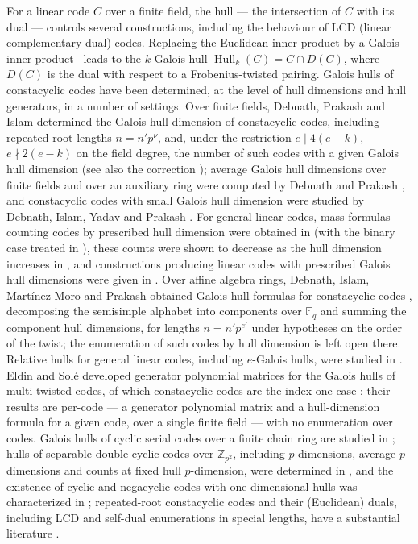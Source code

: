 \documentclass[10pt,journal,draftclsnofoot,onecolumn]{IEEEtran}
\theoremstyle{definition}
\theoremstyle{remark}
\newcommand{\Fq}{\mathbb{F}_q}
\newcommand{\Hull}{\operatorname{Hull}}
\begin{document}
For a linear code \(C\) over a finite field, the hull --- the intersection
of \(C\) with its dual --- controls several constructions, including
the behaviour of LCD (linear complementary dual) codes. Replacing the
Euclidean inner product by a Galois inner product~\cite{FZ2017} leads to the
\(k\)-Galois hull \(\Hull_k(C) = C \cap D(C)\), where \(D(C)\) is the dual
with respect to a Frobenius-twisted pairing. Galois hulls of constacyclic
codes have been determined, at the level of hull dimensions and hull
generators, in a number of settings. Over finite fields,
Debnath, Prakash and Islam determined the Galois hull dimension of
constacyclic codes, including repeated-root lengths \(n = n' p^{\nu}\),
and, under the restriction \(e \mid 4(e-k)\), \(e \nmid 2(e-k)\) on the
field degree, the number of such codes with a given Galois hull
dimension \cite{DPI2023} (see also the correction \cite{DPI2023corr}); average Galois hull dimensions over finite
fields and over an auxiliary ring were computed by Debnath and Prakash
\cite{DP2025}, and constacyclic codes with small Galois hull dimension
were studied by Debnath, Islam, Yadav and Prakash \cite{DIYP2026}. For general linear codes, mass formulas counting codes by prescribed hull dimension were obtained in \cite{LSL2025} (with the binary case treated in \cite{LS2024}), these counts were shown to decrease as the hull dimension increases in \cite{BBO2026}, and constructions producing linear codes with prescribed Galois hull dimensions were given in \cite{LYW2025}. Over
affine algebra rings, Debnath, Islam, Mart\'inez-Moro and Prakash obtained
Galois hull formulas for constacyclic codes \cite{DIMP2026},
decomposing the semisimple alphabet into components over \(\Fq\) and
summing the component hull dimensions, for lengths \(n = n' p^{e'}\)
under hypotheses on the order of the twist; the enumeration of such
codes by hull dimension is left open there. Relative hulls for general linear codes, including \(e\)-Galois hulls, were studied in \cite{ACLMRS2024}. Eldin and Sol\'e
developed generator polynomial matrices for the Galois hulls of
multi-twisted codes, of which constacyclic codes are the index-one case
\cite{ES2026}; their results are per-code --- a generator polynomial
matrix and a hull-dimension formula for a given code, over a single
finite field --- with no enumeration over codes. Galois hulls of cyclic serial codes over a finite chain ring are studied in
\cite{Talbi2021}; hulls of separable double cyclic codes over \(\mathbb{Z}_{p^2}\), including \(p\)-dimensions, average \(p\)-dimensions and counts at fixed hull \(p\)-dimension, were determined in \cite{DPDC2025}, and the existence of cyclic and negacyclic codes with one-dimensional hulls was characterized in \cite{DS2024}; repeated-root constacyclic codes and their (Euclidean)
duals, including LCD and self-dual enumerations in special lengths, have
a substantial literature \cite{CDL2015, Sharma2015, WZLL2023, ZWLL2025}.
\end{document}
